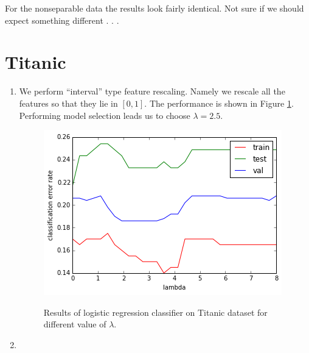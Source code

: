 \documentclass[10pt]{article}
\begin{document}
For the nonseparable data the results look fairly identical. Not sure if we should expect something different . . . 


\section*{Titanic}

\begin{enumerate}
\item We perform ``interval'' type feature rescaling. Namely we rescale all the features so that they lie in $[0,1]$. The performance is shown in Figure \ref{titanic_logit}. Performing model selection leads us to choose $\lambda = 2.5$.
 \begin{figure}
 \centering
 \includegraphics[scale=0.5]{titanic_logit.png}
 \label{titanic_logit}
 \caption{Results of logistic regression classifier on Titanic dataset for different value of $\lambda$.}
 \end{figure}

 \item 


\end{enumerate}
\end{document}
